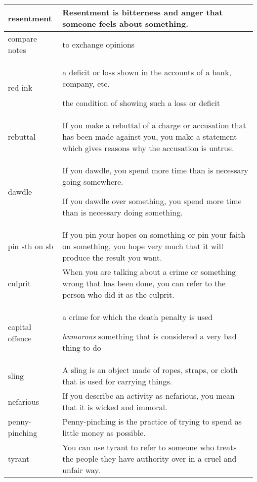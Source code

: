 \documentclass{article}
\begin{document}
\begin{center}
\begin{longtable}{|l|p{9cm}|}
\hline
resentment
&
Resentment is bitterness and anger that someone feels about something.
\\

\hline
compare notes
&
to exchange opinions
\\

\hline
red ink
&
a deficit or loss shown in the accounts of a bank, company, etc.
\par
the condition of showing such a loss or deficit
\\

\hline
rebuttal
&
If you make a rebuttal of a charge or accusation that has been made against you, you make a statement which gives reasons why the accusation is untrue.
\\

\hline
dawdle
&
If you dawdle, you spend more time than is necessary going somewhere.
\par
If you dawdle over something, you spend more time than is necessary doing something.
\\

\hline
pin sth on sb
&
If you pin your hopes on something or pin your faith on something, you hope very much that it will produce the result you want.
\\

\hline
culprit
&
When you are talking about a crime or something wrong that has been done, you can refer to the person who did it as the culprit.
\\

\hline
capital offence
&
a crime for which the death penalty is used
\par
\textit{humorous} something that is considered a very bad thing to do
\\

\hline
sling
&
A sling is an object made of ropes, straps, or cloth that is used for carrying things.
\\

\hline
nefarious
&
If you describe an activity as nefarious, you mean that it is wicked and immoral.
\\

\hline
penny-pinching
&
Penny-pinching is the practice of trying to spend as little money as possible.
\\

\hline
tyrant
&
You can use tyrant to refer to someone who treats the people they have authority over in a cruel and unfair way.
\\


\end{longtable}
\end{center}
\end{document}
